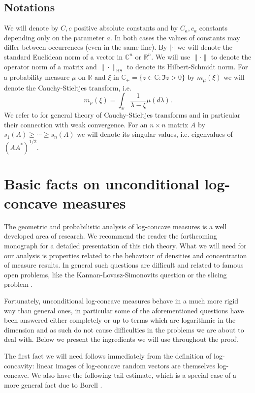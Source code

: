 \documentclass[12pt,reqno]{amsart}
\begin{document}
\subsection*{Notations}
We will denote by $C,c$ positive absolute constants and by $C_a,c_a$ constants
depending only on the parameter $a$. In both cases the values of constants may
differ between occurrences (even in the same line). By $|\cdot|$ we will
denote the standard Euclidean norm of a vector in ${\mathbb{C}}^n$ or ${\mathbb{R}}^n$. We will
use $\|\cdot\|$ to denote the operator norm of a matrix and
$\|\cdot\|_{\mathrm{HS}}$ to denote its Hilbert-Schmidt norm. For a
probability measure $\mu$ on ${\mathbb{R}}$ and $\xi$ in ${\mathbb{C}}_+ = \{z\in {\mathbb{C}}\colon \Im z >
0\}$ by $m_\mu(\xi)$ we will denote the Cauchy-Stieltjes transform, i.e.
\[
m_\mu(\xi) = \int_{\mathbb{R}} \frac{1}{\lambda - \xi}\mu(d\lambda).
\]
We refer to \cite{AGZ,BS} for general theory of Cauchy-Stieltjes transforms
and in particular their connection with weak convergence. For an $n\times n$
matrix $A$ by $s_1(A) \ge \cdots \ge s_n(A)$ we will denote its singular
values, i.e. eigenvalues of $(AA^\ast)^{1/2}$.

\section{Basic facts on unconditional log-concave measures}\label{sec:toolbox}

The geometric and probabilistic analysis of log-concave measures is a well
developed area of research. We recommend the reader the forthcoming monograph
\cite{GiannopoulosBook} for a detailed presentation of this rich theory. What
we will need for our analysis is properties related to the behaviour of
densities and concentration of measure results. In general such questions are
difficult and related to famous open problems, like the
Kannan-Lovasz-Simonovits question \cite{KLS} or the slicing problem
\cite{Hensley, MilmanPajorIsotropic}.

Fortunately, unconditional log-concave measures behave in a much more rigid
way than general ones, in particular some of the aforementioned questions have
been answered either completely or up to terms which are logarithmic in the
dimension and as such do not cause difficulties in the problems we are about
to deal with. Below we present the ingredients we will use throughout the
proof.

The first fact we will need follows immediately from the definition of
log-concavity: linear images of log-concave random vectors are themselves
log-concave. We also have the following tail estimate, which is a special case
of a more general fact due to Borell \cite{B}.
\end{document}
